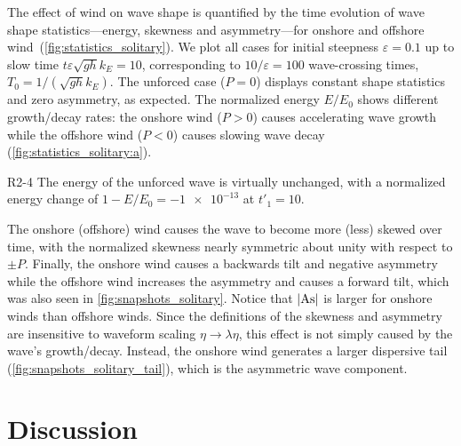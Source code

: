 \documentclass{jfm}
\DeclareMathOperator{\As}{As}
\renewcommand*{\epsilon}{\varepsilon}
\begin{document}
The effect of wind on wave shape is quantified by the time evolution of
wave shape statistics---energy, skewness and asymmetry---for onshore
and offshore wind~(\cref{fig:statistics_solitary}).
We plot all cases for initial steepness $\epsilon = 0.1$ up to slow time
$t \epsilon \sqrt{g h} k_E = 10$, corresponding to $10/\epsilon = 100$
wave-crossing times, $T_0 = 1/(\sqrt{gh} k_E)$.
The unforced case ($P=0$) displays constant shape statistics and zero
asymmetry, as expected.
The normalized energy $E/E_0$ shows different growth/decay rates:
the onshore wind ($P>0$) causes accelerating wave growth while the
offshore wind ($P<0$) causes slowing wave decay
(\cref{fig:statistics_solitary:a}).
\begin{LineLabel}{R2-4}
The energy of the unforced wave is virtually unchanged, with a
normalized energy change of $1-E/E_0 = \num{-1e-13}$ at $t'_1 = 10$.
\end{LineLabel}
The onshore (offshore) wind causes the wave to become more (less) skewed
over time, with the normalized skewness nearly symmetric about unity
with respect to $\pm P$.
Finally, the onshore wind causes a backwards tilt and negative asymmetry
while the offshore wind increases the asymmetry and causes a forward
tilt, which was also seen in \cref{fig:snapshots_solitary}.
Notice that $\abs{\As}$ is larger for onshore winds than offshore winds.
Since the definitions of the skewness and asymmetry are insensitive to
waveform scaling $\eta \to \lambda \eta$, this effect is not simply
caused by the wave's growth/decay.
Instead, the onshore wind generates a larger dispersive tail
(\cref{fig:snapshots_solitary_tail}), which is the asymmetric wave
component.

\section{\label{sec:discussion} Discussion}
\end{document}
